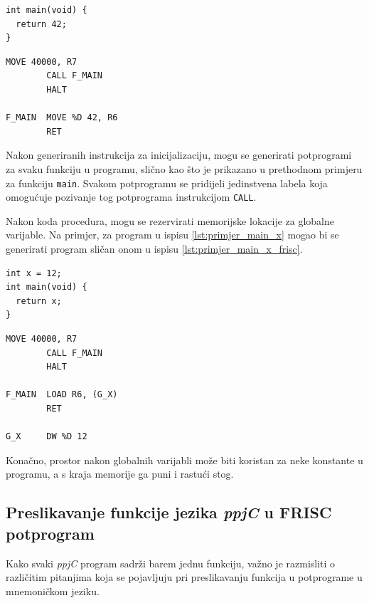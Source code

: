 \documentclass[times, 12pt, utf8]{book}
\begin{document}
\begin{lstlisting}[caption={Jednostavan \emph{ppjC} program.},label=lst:primjer_main_return42]
int main(void) {
  return 42;
}
\end{lstlisting}

\begin{lstlisting}[caption={Mogući generirani FRISC mnemonički program za ispis \ref{lst:primjer_main_return42}.},label=lst:primjer_main_return42_frisc]
        MOVE 40000, R7
        CALL F_MAIN
        HALT
        
F_MAIN  MOVE %D 42, R6
        RET
\end{lstlisting}

Nakon generiranih instrukcija za inicijalizaciju, mogu se generirati potprogrami za svaku funkciju u programu, slično kao što je prikazano u prethodnom primjeru za funkciju \verb|main|.
Svakom potprogramu se pridijeli jedinstvena labela koja omogućuje pozivanje tog potprograma instrukcijom \verb|CALL|.

Nakon koda procedura, mogu se rezervirati memorijske lokacije za globalne varijable.
Na primjer, za program u ispisu \ref{lst:primjer_main_x} mogao bi se generirati program sličan onom u ispisu \ref{lst:primjer_main_x_frisc}.

\begin{lstlisting}[caption={Jednostavan \emph{ppjC} program s globalnom varijablom.},label=lst:primjer_main_x]
int x = 12;
int main(void) {
  return x;
}
\end{lstlisting}

\begin{lstlisting}[caption={Mogući generirani FRISC mnemonički program za ispis \ref{lst:primjer_main_x}.},label=lst:primjer_main_x_frisc]
        MOVE 40000, R7
        CALL F_MAIN
        HALT
        
F_MAIN  LOAD R6, (G_X)
        RET

G_X     DW %D 12
\end{lstlisting}

Konačno, prostor nakon globalnih varijabli može biti koristan za neke konstante u programu, a s kraja memorije ga puni i rastući stog.

\subsection{Preslikavanje funkcije jezika \emph{ppjC} u FRISC potprogram}\label{sec:funkcija->potprogram}
Kako svaki \emph{ppjC} program sadrži barem jednu funkciju, važno je razmisliti o različitim pitanjima koja se pojavljuju pri preslikavanju funkcija u potprograme u mnemoničkom jeziku.
\end{document}

